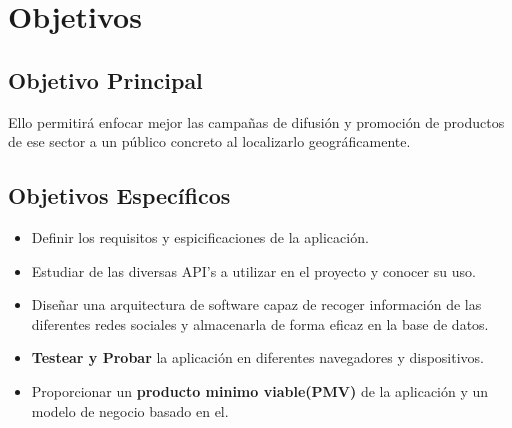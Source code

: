 \chapter{Objetivos}


\section{Objetivo Principal}


Ello permitirá enfocar mejor las campañas de difusión y promoción de productos de ese sector a un público concreto al localizarlo geográficamente.

\vspace{5 mm}

\section{Objetivos Específicos}

\begin{itemize}
  \item Definir los requisitos y espicificaciones de la aplicación.
  \item Estudiar de las diversas API's a utilizar en el proyecto y conocer su uso.
  \item Diseñar una arquitectura de software capaz de recoger información de las diferentes redes sociales y almacenarla de forma eficaz en la base de datos.
  \item \textbf{Testear y Probar} la aplicación en diferentes navegadores y dispositivos.
  \item Proporcionar un \textbf{producto minimo viable(PMV)} de la aplicación y un modelo de negocio basado en el.
\end{itemize}


